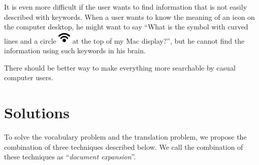 \documentclass[manuscript,anonymous,review]{acmart}
\begin{document}
It is even more difficult if the user wants to find information that is not easily described with keywords.
When a user wants to know the meaning of an icon on the computer desktop, he might want to say
``What is the symbol with curved lines and a circle
\includegraphics[width=6mm,bb=-40 30 225 225]{figures/fb2349ca17df1876178857566e7c68ef.png} %
at the top of my Mac display?'',
but he cannot find the information using such keywords in his brain.

There should be better way to make everything more searchable by casual computer users.

\section{Solutions}


To solve the vocabulary problem and the translation problem,
we propose the combination of three techniques described below.
%
We call the combination of these techniques as ``\textit{document expansion}''.
\end{document}
